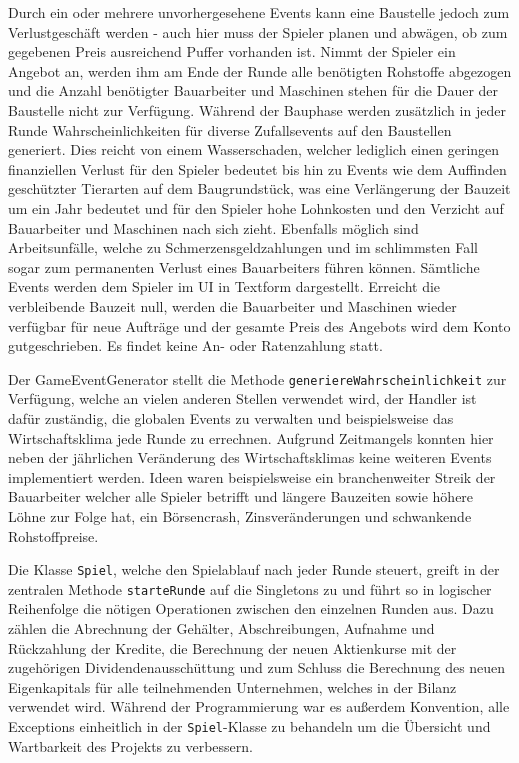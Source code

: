 Durch ein oder mehrere unvorhergesehene Events kann eine Baustelle jedoch zum Verlustgeschäft werden - auch hier muss der Spieler planen und abwägen, ob zum gegebenen Preis ausreichend Puffer vorhanden ist.
Nimmt der Spieler ein Angebot an, werden ihm am Ende der Runde alle benötigten Rohstoffe abgezogen und die Anzahl benötigter Bauarbeiter und Maschinen stehen für die Dauer der Baustelle nicht zur Verfügung. Während der Bauphase werden zusätzlich in jeder Runde Wahrscheinlichkeiten für diverse Zufallsevents auf den Baustellen generiert. Dies reicht von einem Wasserschaden, welcher lediglich einen geringen finanziellen Verlust für den Spieler bedeutet bis hin zu Events wie dem Auffinden geschützter Tierarten auf dem Baugrundstück, was eine Verlängerung der Bauzeit um ein Jahr bedeutet und für den Spieler hohe Lohnkosten und den Verzicht auf Bauarbeiter und Maschinen nach sich zieht. Ebenfalls möglich sind Arbeitsunfälle, welche zu Schmerzensgeldzahlungen und im schlimmsten Fall sogar zum permanenten Verlust eines Bauarbeiters führen können. Sämtliche Events werden dem Spieler im UI in Textform dargestellt.
Erreicht die verbleibende Bauzeit null, werden die Bauarbeiter und Maschinen wieder verfügbar für neue Aufträge und der gesamte Preis des Angebots wird dem Konto gutgeschrieben. Es findet keine An- oder Ratenzahlung statt.

Der GameEventGenerator stellt die Methode \texttt{generiereWahrscheinlichkeit} zur Verfügung, welche an vielen anderen Stellen verwendet wird, der Handler ist dafür zuständig, die globalen Events zu verwalten und beispielsweise das Wirtschaftsklima jede Runde zu errechnen. Aufgrund Zeitmangels konnten hier neben der jährlichen Veränderung des Wirtschaftsklimas keine weiteren Events implementiert werden. Ideen waren beispielsweise ein branchenweiter Streik der Bauarbeiter welcher alle Spieler betrifft und längere Bauzeiten sowie höhere Löhne zur Folge hat, ein Börsencrash, Zinsveränderungen und schwankende Rohstoffpreise.

Die Klasse \texttt{Spiel}, welche den Spielablauf nach jeder Runde steuert, greift in der zentralen Methode \texttt{starteRunde} auf die Singletons zu und führt so in logischer Reihenfolge die nötigen Operationen zwischen den einzelnen Runden aus. Dazu zählen die Abrechnung der Gehälter, Abschreibungen, Aufnahme und Rückzahlung der Kredite, die Berechnung der neuen Aktienkurse mit der zugehörigen Dividendenausschüttung und zum Schluss die Berechnung des neuen Eigenkapitals für alle teilnehmenden Unternehmen, welches in der Bilanz verwendet wird. Während der Programmierung war es außerdem Konvention, alle Exceptions einheitlich in der \texttt{Spiel}-Klasse zu behandeln um die Übersicht und Wartbarkeit des Projekts zu verbessern.


